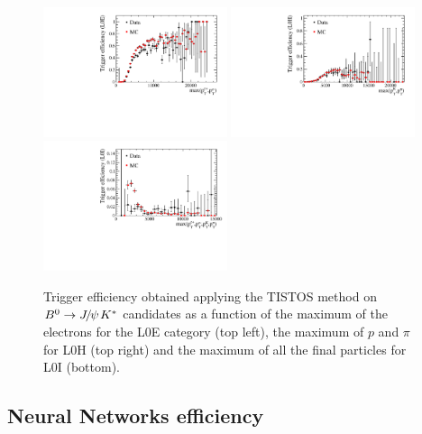 \begin{figure}[h!]
\centering
\includegraphics[width=0.48\textwidth]{RKst/figs/TisTos_vs_maxPTLL_L0E.pdf}
\includegraphics[width=0.48\textwidth]{RKst/figs/TisTos_vs_maxPTHH_L0H.pdf}
\includegraphics[width=0.48\textwidth]{RKst/figs/TisTos_vs_maxPT_L0I.pdf}
\caption{Trigger efficiency obtained applying the TISTOS method on $\Bz\to\jpsi\Kstar$ candidates
as a function of the maximum \pt of the electrons for the L0E category (top left), the maximum \pt
of $p$ and $\pi$ for L0H (top right) and the maximum \pt of all the final particles for L0I (bottom).}
\label{fig:tistos_vs_pt}
\end{figure}


\subsection{Neural Networks efficiency}
\label{sec:Rkst_mva_eff}

